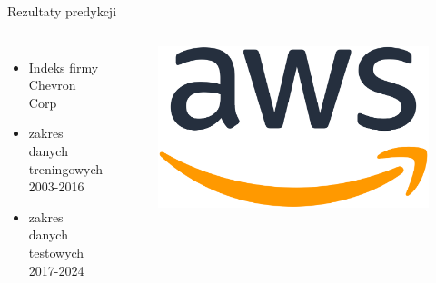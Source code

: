 \begin{frame}{Rezultaty predykcji}
    \begin{columns}[t]
            \begin{itemize}
                \item Indeks firmy Chevron Corp
                \item zakres danych treningowych 2003-2016
                \item zakres danych testowych 2017-2024
            \end{itemize}
        \centering
        \begin{figure}
            \centering
            \includegraphics[width=1\textwidth]{images/aws_logo.png}
        \end{figure}    
    \end{columns}
\end{frame}

